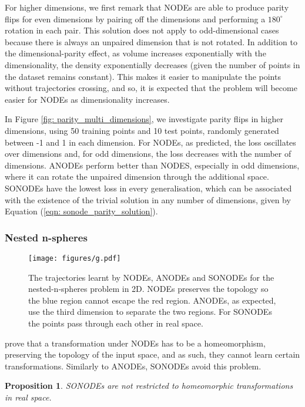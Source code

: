 \documentclass{article}
\newtheorem{proposition}[theorem]{Proposition}
\theoremstyle{remark}
\theoremstyle{definition}
\begin{document}
For higher dimensions, we first remark that NODEs are able to produce parity flips for even dimensions by pairing off the dimensions and performing a $180^{\circ}$ rotation in each pair. This solution does not apply to odd-dimensional cases because there is always an unpaired dimension that is not rotated.
In addition to the dimensional-parity effect, as volume increases exponentially with the dimensionality, the density exponentially decreases (given the number of points in the dataset remains constant). This makes it easier to manipulate the points without trajectories crossing, and so, it is expected that the problem will become easier for NODEs as dimensionality increases.

In Figure \ref{fig: parity_multi_dimensions}, we investigate parity flips in higher dimensions, using 50 training points and 10 test points, randomly generated between -1 and 1 in each dimension. For NODEs, as predicted, the loss oscillates over dimensions and, for odd dimensions, the loss decreases with the number of dimensions. ANODEs perform better than NODES, especially in odd dimensions, where it can rotate the unpaired dimension through the additional space. SONODEs have the lowest loss in every generalisation, which can be associated with the existence of the trivial solution in any number of dimensions, given by Equation (\ref{eqn: sonode_parity_solution}).

\subsubsection{Nested n-spheres}
\begin{figure}[b]
    \centering
    \texttt{[image: figures/g.pdf]}
    \caption{The trajectories learnt by NODEs, ANODEs and SONODEs for the nested-n-spheres problem in 2D. NODEs preserves the topology so the blue region cannot escape the red region. ANODEs, as expected, use the third dimension to separate the two regions. For SONODEs the points pass through each other in real space.}
    \label{fig: g}
\end{figure}

\citet{dupont2019augmented} prove that a transformation under NODEs has to be a homeomorphism, preserving the topology of the input space, and as such, they cannot learn certain transformations. Similarly to ANODEs, SONODEs avoid this problem.

\begin{proposition}
SONODEs are not restricted to homeomorphic transformations in real space.
\end{proposition}
\end{document}
